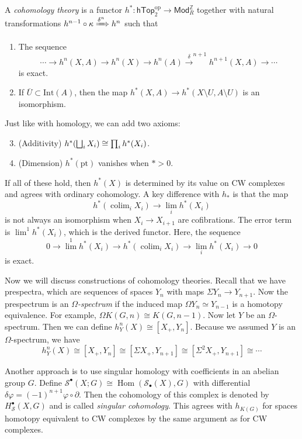 \documentclass[leqno, openany]{memoir}
\theoremstyle{definition}
\theoremstyle{remark}
\theoremstyle{plain}
\theoremstyle{definition}
\theoremstyle{remark}
\newcommand{\Z}{\mathbb{Z}}
\newcommand{\mc}[1]{\mathcal{#1}}
\newcommand{\mr}[1]{\mathrm{#1}}
\newcommand{\ms}[1]{\mathsf{#1}}
\newcommand{\ol}[1]{\overline{#1}}
\DeclareMathOperator{\Hom}{Hom}
\begin{document}
A \textit{cohomology theory} is a functor $h^* \colon \ms{hTop}_2^{\mr{op}} \to \ms{Mod}_R^{\Z}$ together with natural transformations $h^{n-1} \circ \kappa \xRightarrow{\delta^n} h^n$ such that
\begin{enumerate}
    \item The sequence
        \[ \cdots \to h^n(X,A) \to h^n(X) \to h^n(A) \xrightarrow{\delta}^{n+1} h^{n+1}(X,A) \to \cdots \]
        is exact.
    \item If $\ol{U} \subset \mr{Int}(A)$, then the map $h^*(X,A) \to h^*(X \setminus U, A \setminus U)$ is an isomorphism.
\end{enumerate}
Just like with homology, we can add two axioms:
\begin{enumerate}
    \setcounter{enumi}{2}
    \item (Additivity) $h^*\qty(\bigsqcup_i X_i) \cong \prod_i h^*(X_i)$.
    \item (Dimension) $h^*(\mr{pt})$ vanishes when $* > 0$.
\end{enumerate}
If all of these hold, then $h^*(X)$ is determined by its value on CW complexes and agrees with ordinary cohomology. A key difference with $h_*$ is that the map 
\[ h^*(\operatorname{colim}_i X_i) \to \lim_i h^*(X_i) \]
is not always an isomorphism when $X_i \to X_{i+1}$ are cofibrations. The error term is $\lim^1 h^*(X_i)$, which is the derived functor. Here, the sequence
\[ 0 \to \lim^1 h^*(X_i) \to h^*(\operatorname{colim}_i X_i) \to \lim_i h^*(X_i) \to 0 \]
is exact.

Now we will discuss constructions of cohomology theories. Recall that we have prespectra, which are sequences of spaces $Y_n$ with maps $\Sigma Y_n \to Y_{n+1}$. Now the prespectrum is an \textit{$\Omega$-spectrum} if the induced map $\Omega Y_n \simeq Y_{n-1}$ is a homotopy equivalence. For example, $\Omega K(G,n) \cong K(G, n-1)$. Now let $Y$ be an $\Omega$-spectrum. Then we can define $h_Y^n(X) \cong [X_+, Y_n]$. Because we assumed $Y$ is an $\Omega$-spectrum, we have
\[ h_Y^n(X) \cong [X_+, Y_n] \cong [\Sigma X_+, Y_{n+1}] \cong [\Sigma^2 X_+, Y_{n+1}] \cong \cdots \]

Another approach is to use singular homology with coefficients in an abelian group $G$. Define $\mc{S}^{\bullet}(X; G) \cong \Hom(\mc{S}_{\bullet}(X), G)$ with differential $\delta \varphi = {(-1)}^{n+1} \varphi \circ \partial$. Then the cohomology of this complex is denoted by $H_{\mc{S}}^{\bullet}(X,G)$ and is called \textit{singular cohomology}. This agrees with $h_{K(G)}$ for spaces homotopy equivalent to CW complexes by the same argument as for CW complexes.
\end{document}
